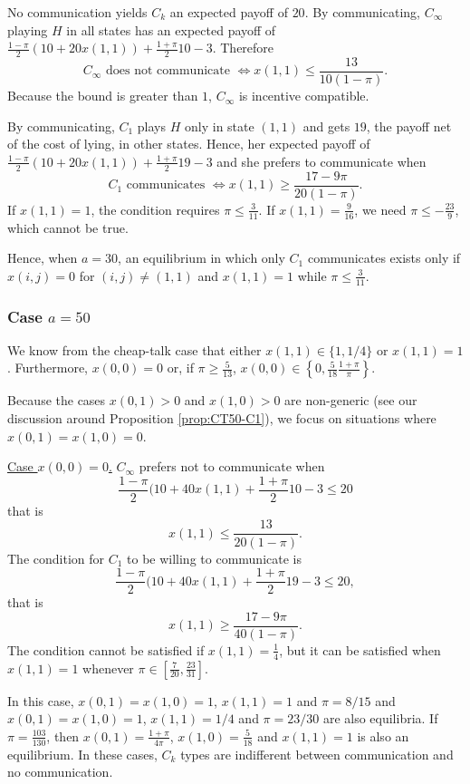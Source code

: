 \documentclass[12pt]{article}
\theoremstyle{definition}
\theoremstyle{remark}
\begin{document}
No communication yields $C_k$ an expected payoff of $20$. By communicating, $C_\infty$ playing $H$ in all states has an expected payoff of $\frac{1-\pi}{2}(10+20x(1,1))+\frac{1+\pi}{2}10-3$. Therefore
$$
C_\infty \text{ does not communicate }\Leftrightarrow x(1,1)\leq \frac{13}{10(1-\pi)}.
$$
Because the bound is greater than $1$, $C_\infty$ is incentive compatible.

By communicating, $C_1$ plays $H$ only in state $(1,1)$ and gets $19$, the payoff net of the cost of lying, in other states. Hence, her expected payoff of $\frac{1-\pi}{2}(10+20x(1,1))+\frac{1+\pi}{2}19-3$
and she prefers to communicate when
$$
C_1 \text{ communicates }\Leftrightarrow x(1,1)\geq \frac{17-9\pi}{20(1-\pi)}.
$$
If $x(1,1)=1$, the condition requires $\pi\leq \frac{3}{11}$. If $x(1,1)=\frac{9}{16}$, we need $\pi\leq - \frac{23}{9}$, which cannot be true.

Hence, when $a=30$, an equilibrium in which only $C_1$ communicates exists only if $x(i,j)=0$ for $(i,j)\neq (1,1)$ and $x(1,1)=1$ while $\pi\leq \frac{3}{11}$.

\subsubsection*{Case $a=50$} 
We know from the cheap-talk case that either $x(1,1)\in\{1,1/4\}$ or $x(1,1)=1$. Furthermore, $x(0,0)=0$ or, if $\pi\geq \frac{5}{13}$, $x(0,0)\in\left\{0, \frac{5}{18}\frac{1+\pi}{\pi}\right\}$.

Because the cases $x(0,1)>0$ and $x(1,0)>0$ are non-generic (see our discussion around Proposition \ref{prop:CT50-C1}), we focus on situations where $x(0,1)=x(1,0)=0$.

\underline{Case $x(0,0)=0$.}
$C_\infty$ prefers not to communicate when
\[
\frac{1-\pi}{2}(10+40x(1,1)+\frac{1+\pi}{2}10-3\leq 20
\]
that is 
\[
x(1,1)\leq \frac{13}{20(1-\pi)}.
\]
The condition for $C_1$ to be willing to communicate is
\[
\frac{1-\pi}{2}(10+40x(1,1)+\frac{1+\pi}{2}19-3\leq 20,
\]
that is 
\[
x(1,1)\geq \frac{17-9\pi}{40(1-\pi)}.
\]
The condition cannot be satisfied if $x(1,1)=\frac{1}{4}$, but it can be satisfied when $x(1,1)=1$ whenever $\pi\in \left[\frac{7}{20},\frac{23}{31}\right]$.

In this case, $x(0,1)=x(1,0)=1$, $x(1,1)=1$ and $\pi = 8/15$ and $x(0,1)=x(1,0)=1$, $x(1,1)=1/4$ and $\pi = 23/30$ are also equilibria. If $\pi=\frac{103}{130}$, then $x(0,1)=\frac{1+\pi}{4\pi}$, $x(1,0)=\frac{5}{18}$ and $x(1,1)=1$ is also an equilibrium. In these cases, $C_k$ types are indifferent between communication and no communication.
\end{document}
